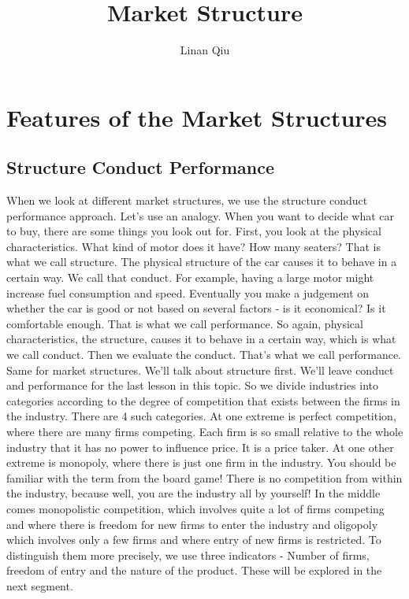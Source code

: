 \documentclass[DIV=classic,11pt,numbers=noenddot,listof=totoc,bibliography=totoc,parskip]{scrartcl}
\title{Market Structure}
\author{Linan Qiu}
\date{}
\begin{document}
\maketitle
\tableofcontents
\newpage
\newpage
\newpage
\section{Features of the Market Structures}
\subsection{Structure Conduct Performance}
When we look at different market structures, we use the structure conduct performance approach. Let’s use an analogy. When you want to decide what car to buy, there are some things you look out for. First, you look at the physical characteristics. What kind of motor does it have? How many seaters? That is what we call structure. The physical structure of the car causes it to behave in a certain way. We call that conduct. For example, having a large motor might increase fuel consumption and speed. Eventually you make a judgement on whether the car is good or not based on several factors - is it economical? Is it comfortable enough. That is what we call performance. So again, physical characteristics, the structure, causes it to behave in a certain way, which is what we call conduct. Then we evaluate the conduct. That’s what we call performance. Same for market structures. We’ll talk about structure first. We’ll leave conduct and performance for the last lesson in this topic. So we divide industries into categories according to the degree of competition that exists between the firms in the industry. There are 4 such categories. At one extreme is perfect competition, where there are many firms competing. Each firm is so small relative to the whole industry that it has no power to influence price. It is a price taker. At one other extreme is monopoly, where there is just one firm in the industry. You should be familiar with the term from the board game! There is no competition from within the industry, because well, you are the industry all by yourself! In the middle comes monopolistic competition, which involves quite a lot of firms competing and where there is freedom for new firms to enter the industry and oligopoly which involves only a few firms and where entry of new firms is restricted. To distinguish them more precisely, we use three indicators - Number of firms, freedom of entry and the nature of the product. These will be explored in the next segment.
\end{document}
